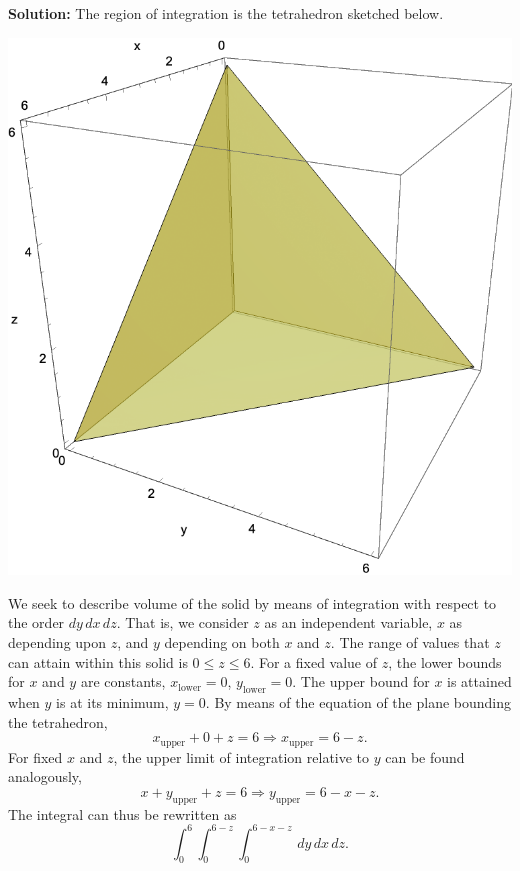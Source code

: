 \documentclass[12pt,oneside]{exam}
\newenvironment{newsolution}{\vspace{.1in}\noindent\textbf{Solution: \hspace{.05em}}}{}
\begin{document}
\begin{newsolution}
The region of integration is the tetrahedron sketched below. 
\begin{center}
\includegraphics[scale=0.5]{p9.pdf}
\end{center}
We seek to describe volume of the solid by means of integration with respect to the order $dy \, dx \, dz$. That is, we consider $z$ as an independent variable, $x$ as depending upon $z$, and $y$ depending on both $x$ and $z$. The range of values that $z$ can attain within this solid is $0 \leq z \leq 6$. For a fixed value of $z$, the lower bounds for $x$ and $y$ are constants, $x_{\mathrm{lower}}=0$, $y_{\mathrm{lower}}=0$. The upper bound for $x$ is attained when $y$ is at its minimum, $y=0$. By means of the equation of the plane bounding the tetrahedron, 
\begin{equation*}
x_{\mathrm{upper}} + 0 + z = 6 \Rightarrow x_{\mathrm{upper}} = 6-z.
\end{equation*}
For fixed $x$ and $z$, the upper limit of integration relative to $y$ can be found analogously, 
\begin{equation*}
x + y_{\mathrm{upper}}  + z = 6 \Rightarrow y_{\mathrm{upper}} = 6-x-z.
\end{equation*}
The integral can thus be rewritten as 
\begin{equation*}
\int_{0}^{6} \int_{0}^{6-z} \int_{0}^{6-x-z} \, dy \, dx \, dz.
\end{equation*}
\end{newsolution}
\end{document}
